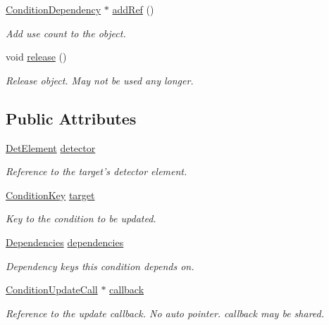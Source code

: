 \begin{DoxyCompactItemize}
\hyperlink{class_d_d4hep_1_1_conditions_1_1_condition_dependency}{ConditionDependency} $\ast$ \hyperlink{class_d_d4hep_1_1_conditions_1_1_condition_dependency_a84b132a3ba867a4588d34e75e8fc297a}{addRef} ()
\begin{DoxyCompactList}\small\item\em Add use count to the object. \item\end{DoxyCompactList}\item 
void \hyperlink{class_d_d4hep_1_1_conditions_1_1_condition_dependency_afdaaf31337b8f15156a1b8fad3895107}{release} ()
\begin{DoxyCompactList}\small\item\em Release object. May not be used any longer. \item\end{DoxyCompactList}\end{DoxyCompactItemize}
\subsection*{Public Attributes}
\begin{DoxyCompactItemize}
\item 
\hyperlink{class_d_d4hep_1_1_geometry_1_1_det_element}{DetElement} \hyperlink{class_d_d4hep_1_1_conditions_1_1_condition_dependency_a967bc771b0504b80f8ecfa879e03e498}{detector}
\begin{DoxyCompactList}\small\item\em Reference to the target's detector element. \item\end{DoxyCompactList}\item 
\hyperlink{class_d_d4hep_1_1_conditions_1_1_condition_key}{ConditionKey} \hyperlink{class_d_d4hep_1_1_conditions_1_1_condition_dependency_a1a6c5ef0f44fa4c97fda1f750dd81dc2}{target}
\begin{DoxyCompactList}\small\item\em Key to the condition to be updated. \item\end{DoxyCompactList}\item 
\hyperlink{class_d_d4hep_1_1_conditions_1_1_condition_dependency_af1594501f40e514c5748092b94e4fd84}{Dependencies} \hyperlink{class_d_d4hep_1_1_conditions_1_1_condition_dependency_ac90a62165ff00d712a03d48716521c51}{dependencies}
\begin{DoxyCompactList}\small\item\em Dependency keys this condition depends on. \item\end{DoxyCompactList}\item 
\hyperlink{class_d_d4hep_1_1_conditions_1_1_condition_update_call}{ConditionUpdateCall} $\ast$ \hyperlink{class_d_d4hep_1_1_conditions_1_1_condition_dependency_aa90b6ad647f576574502b6c023b88372}{callback}
\begin{DoxyCompactList}\small\item\em Reference to the update callback. No auto pointer. callback may be shared. \item\end{DoxyCompactList}\end{DoxyCompactItemize}
